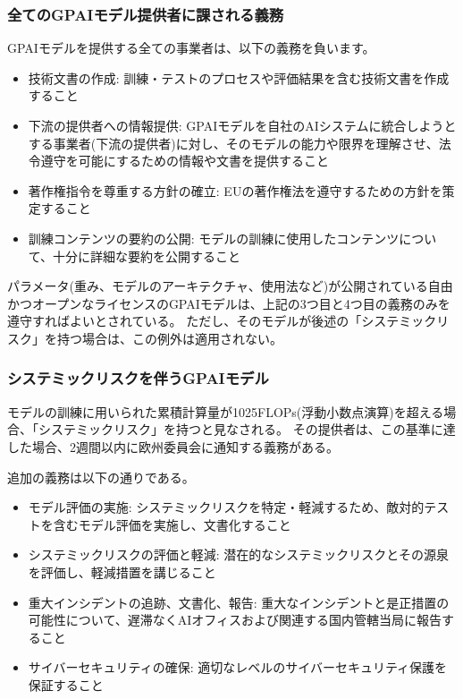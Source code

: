 \subsubsection*{全てのGPAIモデル提供者に課される義務}

GPAIモデルを提供する全ての事業者は、以下の義務を負います。

\begin{itemize}
    \item 技術文書の作成: 訓練・テストのプロセスや評価結果を含む技術文書を作成すること
    \item 下流の提供者への情報提供: GPAIモデルを自社のAIシステムに統合しようとする事業者(下流の提供者)に対し、そのモデルの能力や限界を理解させ、法令遵守を可能にするための情報や文書を提供すること
    \item 著作権指令を尊重する方針の確立: EUの著作権法を遵守するための方針を策定すること
    \item 訓練コンテンツの要約の公開: モデルの訓練に使用したコンテンツについて、十分に詳細な要約を公開すること
\end{itemize}

パラメータ(重み、モデルのアーキテクチャ、使用法など)が公開されている自由かつオープンなライセンスのGPAIモデルは、上記の3つ目と4つ目の義務のみを遵守すればよいとされている。
ただし、そのモデルが後述の「システミックリスク」を持つ場合は、この例外は適用されない。



\subsubsection*{システミックリスクを伴うGPAIモデル}

モデルの訓練に用いられた累積計算量が1025FLOPs(浮動小数点演算)を超える場合、「システミックリスク」を持つと見なされる。
その提供者は、この基準に達した場合、2週間以内に欧州委員会に通知する義務がある。

追加の義務は以下の通りである。

\begin{itemize}
    \item モデル評価の実施: システミックリスクを特定・軽減するため、敵対的テストを含むモデル評価を実施し、文書化すること
    \item システミックリスクの評価と軽減: 潜在的なシステミックリスクとその源泉を評価し、軽減措置を講じること
    \item 重大インシデントの追跡、文書化、報告: 重大なインシデントと是正措置の可能性について、遅滞なくAIオフィスおよび関連する国内管轄当局に報告すること
    \item サイバーセキュリティの確保: 適切なレベルのサイバーセキュリティ保護を保証すること
\end{itemize}


